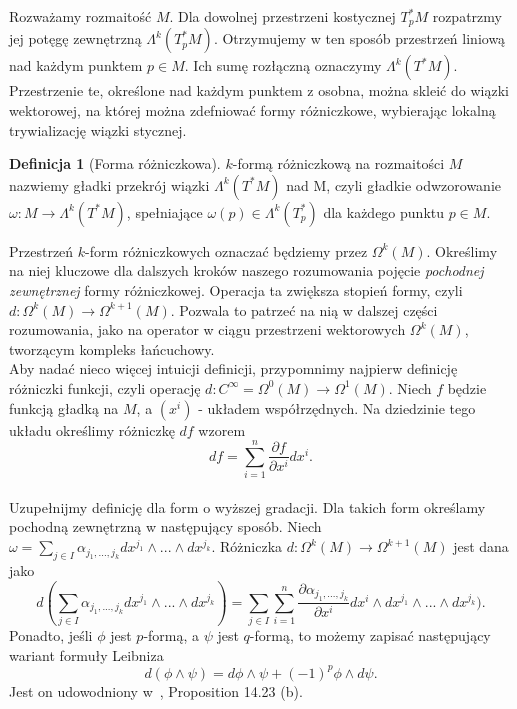 \documentclass[licencjacka]{pracamgr}
\theoremstyle{definition}
\newtheorem{definition}{Definicja}[section]
\theoremstyle{definition}
\theoremstyle{plain}
\theoremstyle{plain}
\theoremstyle{plain}
\theoremstyle{plain}
\begin{document}
Rozważamy rozmaitość $M$. Dla dowolnej przestrzeni kostycznej 
$T_p^\ast M$ rozpatrzmy jej potęgę zewnętrzną $\Lambda^k(T_p^\ast M)$.
Otrzymujemy w ten sposób przestrzeń liniową nad każdym punktem $p \in M$.
Ich sumę rozłączną oznaczymy $\Lambda^k(T^\ast M)$. Przestrzenie te,
określone nad każdym punktem z osobna, można skleić do wiązki wektorowej, na
której można zdefniować formy różniczkowe, wybierając lokalną
trywializację wiązki stycznej. \\

\begin{definition}[Forma różniczkowa]
  $k$-formą różniczkową na rozmaitości $M$ nazwiemy gładki przekrój wiązki
  $\Lambda^k(T^\ast M)$ nad M, czyli gładkie odwzorowanie $\omega: M \rightarrow
  \Lambda^k (T^\ast M)$, spełniające $\omega(p) \in \Lambda^k(T_p^\ast)$ dla
  każdego punktu $p \in M$.
\end{definition}

Przestrzeń $k$-form różniczkowych oznaczać będziemy przez $\Omega^k(M)$. 
Określimy na niej kluczowe dla dalszych kroków naszego rozumowania pojęcie
\emph{pochodnej zewnętrznej} formy różniczkowej. Operacja ta zwiększa stopień
formy, czyli $d: \Omega^k(M) \rightarrow \Omega^{k+1} (M)$. Pozwala to patrzeć
na nią w dalszej części rozumowania, jako na operator w ciągu przestrzeni
wektorowych $\Omega^k(M)$, tworzącym kompleks łańcuchowy. \\

Aby nadać nieco więcej intuicji definicji, przypomnimy najpierw
definicję różniczki funkcji, czyli operację 
$d: C^\infty = \Omega^0(M) \rightarrow \Omega^1(M)$. Niech $f$ będzie funkcją
gładką na $M$, a $(x^i)$ -  układem współrzędnych. Na dziedzinie tego układu
określimy różniczkę $df$ wzorem
\begin{equation}\label{exterior-derivative-for-one-forms}
df = \sum_{i=1}^n \frac{\partial f}{\partial x^i} dx^i.
\end{equation} \\

Uzupełnijmy definicję dla form o wyższej gradacji. Dla takich form określamy
pochodną zewnętrzną w następujący sposób. Niech 
$\omega = \sum_{j \in I} \alpha_{j_1, ..., j_k} dx^{j_1} \wedge ... \wedge dx^{j_k}$.
Różniczka $d: \Omega^k(M) \rightarrow \Omega^{k+1}(M)$ jest dana jako
\[ %
d( \sum_{j \in I} \alpha_{j_1, ..., j_k} dx^{j_1} \wedge ... \wedge dx^{j_k}) = 
 \sum_{j \in I} \sum_{i=1}^n
 \frac{ \partial \alpha_{j_1, ..., j_k}} {\partial x^i} dx^i
                            \wedge dx^{j_1} \wedge ... \wedge dx^{j_k}).
\]
Ponadto, jeśli $\phi$ jest $p$-formą, a $\psi$ jest $q$-formą, to możemy
zapisać następujący wariant formuły Leibniza
\[
d(\phi \wedge \psi) = d\phi \wedge \psi + (-1)^p \phi \wedge d\psi.
\]
Jest on udowodniony w~\cite{lee}, Proposition 14.23 (b). \\
\end{document}
